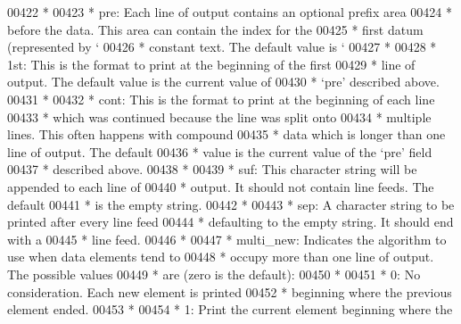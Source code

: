 \begin{DoxyCode}
{{{{{{{{{{{{{{{{{00422 \textcolor{comment}{     *}
00423 \textcolor{comment}{     *   pre:       Each line of output contains an optional prefix area}
00424 \textcolor{comment}{     *              before the data. This area can contain the index for the}
00425 \textcolor{comment}{     *              first datum (represented by `%
00426 \textcolor{comment}{     *              constant text.  The default value is `%
00427 \textcolor{comment}{     *}
00428 \textcolor{comment}{     *   1st:       This is the format to print at the beginning of the first}
00429 \textcolor{comment}{     *              line of output. The default value is the current value of}
00430 \textcolor{comment}{     *              `pre' described above.}
00431 \textcolor{comment}{     *}
00432 \textcolor{comment}{     *   cont:      This is the format to print at the beginning of each line}
00433 \textcolor{comment}{     *              which was continued because the line was split onto}
00434 \textcolor{comment}{     *              multiple lines. This often happens with compound}
00435 \textcolor{comment}{     *              data which is longer than one line of output. The default}
00436 \textcolor{comment}{     *              value is the current value of the `pre' field}
00437 \textcolor{comment}{     *              described above.}
00438 \textcolor{comment}{     *}
00439 \textcolor{comment}{     *   suf:       This character string will be appended to each line of}
00440 \textcolor{comment}{     *              output.  It should not contain line feeds.  The default}
00441 \textcolor{comment}{     *              is the empty string.}
00442 \textcolor{comment}{     *}
00443 \textcolor{comment}{     *   sep:       A character string to be printed after every line feed}
00444 \textcolor{comment}{     *              defaulting to the empty string.  It should end with a}
00445 \textcolor{comment}{     *              line feed.}
00446 \textcolor{comment}{     *}
00447 \textcolor{comment}{     *   multi\_new: Indicates the algorithm to use when data elements tend to}
00448 \textcolor{comment}{     *              occupy more than one line of output. The possible values}
00449 \textcolor{comment}{     *              are (zero is the default):}
00450 \textcolor{comment}{     *}
00451 \textcolor{comment}{     *              0:  No consideration. Each new element is printed}
00452 \textcolor{comment}{     *                  beginning where the previous element ended.}
00453 \textcolor{comment}{     *}
00454 \textcolor{comment}{     *              1:  Print the current element beginning where the}
}}}}}}}}}}}}}}}}}}}
\end{DoxyCode}
